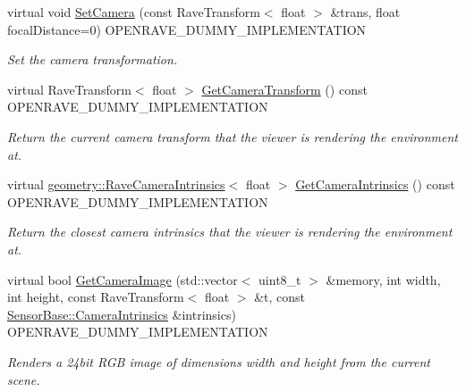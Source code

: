 \begin{Indent}{\bf }\par
{\em \label{_amgrpd41d8cd98f00b204e9800998ecf8427e}
 }\begin{DoxyCompactItemize}
\item 
virtual void \hyperlink{classOpenRAVE_1_1ViewerBase_ae426230d17214ba9e81e7ca30a1437e6}{SetCamera} (const RaveTransform$<$ float $>$ \&trans, float focalDistance=0) OPENRAVE\_\-DUMMY\_\-IMPLEMENTATION
\begin{DoxyCompactList}\small\item\em Set the camera transformation. \item\end{DoxyCompactList}\item 
\hypertarget{classOpenRAVE_1_1ViewerBase_ac63f4828ecf7cfd87feb7f67be71bb04}{
virtual RaveTransform$<$ float $>$ \hyperlink{classOpenRAVE_1_1ViewerBase_ac63f4828ecf7cfd87feb7f67be71bb04}{GetCameraTransform} () const OPENRAVE\_\-DUMMY\_\-IMPLEMENTATION}
\label{classOpenRAVE_1_1ViewerBase_ac63f4828ecf7cfd87feb7f67be71bb04}

\begin{DoxyCompactList}\small\item\em Return the current camera transform that the viewer is rendering the environment at. \item\end{DoxyCompactList}\item 
\hypertarget{classOpenRAVE_1_1ViewerBase_aa280b50e2cd6e717b03a83245546e467}{
virtual \hyperlink{classOpenRAVE_1_1geometry_1_1RaveCameraIntrinsics}{geometry::RaveCameraIntrinsics}$<$ float $>$ \hyperlink{classOpenRAVE_1_1ViewerBase_aa280b50e2cd6e717b03a83245546e467}{GetCameraIntrinsics} () const OPENRAVE\_\-DUMMY\_\-IMPLEMENTATION}
\label{classOpenRAVE_1_1ViewerBase_aa280b50e2cd6e717b03a83245546e467}

\begin{DoxyCompactList}\small\item\em Return the closest camera intrinsics that the viewer is rendering the environment at. \item\end{DoxyCompactList}\item 
virtual bool \hyperlink{classOpenRAVE_1_1ViewerBase_ad149822b9f25bf1adf3d76e78379cca5}{GetCameraImage} (std::vector$<$ uint8\_\-t $>$ \&memory, int width, int height, const RaveTransform$<$ float $>$ \&t, const \hyperlink{classOpenRAVE_1_1geometry_1_1RaveCameraIntrinsics}{SensorBase::CameraIntrinsics} \&intrinsics) OPENRAVE\_\-DUMMY\_\-IMPLEMENTATION
\begin{DoxyCompactList}\small\item\em Renders a 24bit RGB image of dimensions width and height from the current scene. \item\end{DoxyCompactList}\end{DoxyCompactItemize}
\end{Indent}
